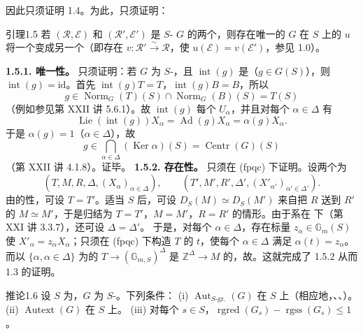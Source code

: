 因此只须证明 1.4。为此，只须证明：
\begin{SGAresult}{引理}{1.5}
若 $(\mathcal R,\mathcal E)$ 和 $(\mathcal R',\mathcal E')$ 是 $S$- $G$ 的两个，则存在唯一的 $G$ 在 $S$ 上的 $u$ 将一个变成另一个（即存在 $v:\mathcal R'\xrightarrow\sim\mathcal R$，使 $u(\mathcal E)=v(\mathcal E')$，参见 1.0）。
\end{SGAresult}
\textbf{1.5.1. 唯一性。} 只须证明：若 $G$ 为 $S$-，且 $\operatorname{int}(g)$ 是（$g\in G(S)$），则 $\operatorname{int}(g)=\mathrm{id}$。首先 $\operatorname{int}(g)T=T$，$\operatorname{int}(g)B=B$，所以
\[g\in\operatorname{Norm}_G(T)(S)\cap\operatorname{Norm}_G(B)(S)=T(S)\]
（例如参见第 XXII 讲 5.6.1）。故 $\operatorname{int}(g)$ 每个 $U_\alpha$，并且对每个 $\alpha\in\Delta$ 有
\[\operatorname{Lie}(\operatorname{int}(g))X_\alpha=\operatorname{Ad}(g)X_\alpha=\alpha(g)X_\alpha.\]
于是 $\alpha(g)=1$（$\alpha\in\Delta$），故
\[g\in\bigcap_{\alpha\in\Delta}(\operatorname{Ker}\alpha)(S)=\operatorname{Centr}(G)(S)\]
（第 XXII 讲 4.1.8）。证毕。
\textbf{1.5.2. 存在性。} 只须在 (fpqc) 下证明。设两个为
\[(T,M,R,\Delta,(X_\alpha)_{\alpha\in\Delta}),\qquad(T',M',R',\Delta',(X'_{\alpha'})_{\alpha'\in\Delta'}).\]
由的性，可设 $T=T'$。适当 $S$ 后，可设 $D_S(M)\simeq D_S(M')$ 来自把 $R$ 送到 $R'$ 的 $M\simeq M'$，于是归结为 $T=T'$，$M=M'$，$R=R'$ 的情形。由于系在 下（第 XXI 讲 3.3.7），还可设 $\Delta=\Delta'$。
于是，对每个 $\alpha\in\Delta$，存在标量 $z_\alpha\in\mathbb G_m(S)$ 使 $X'_\alpha=z_\alpha X_\alpha$；只须在 (fpqc) 下构造 $T$ 的 $t$，使每个 $\alpha\in\Delta$ 满足 $\alpha(t)=z_\alpha$。而以 $\{\alpha,\alpha\in\Delta\}$ 为的 $T\to(\mathbb G_{m,S})^\Delta$ 是 $\mathbb Z^\Delta\to M$ 的，故。这就完成了 1.5.2 从而 1.3 的证明。
\begin{SGAresult}{推论}{1.6}
设 $S$ 为，$G$ 为 $S$-。下列条件：
(i) $\operatorname{Aut}_{S\text{-gr.}}(G)$ 在 $S$ 上（相应地，、、）。
(ii) $\operatorname{Autext}(G)$ 在 $S$ 上。
(iii) 对每个 $s\in S$，$\operatorname{rgred}(G_s)-\operatorname{rgss}(G_s)\leq1$。
\end{SGAresult}
